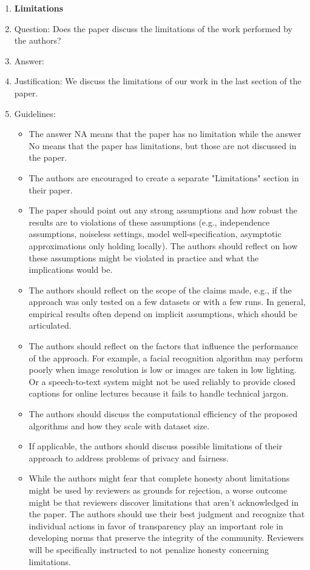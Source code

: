 \documentclass{article}
\begin{document}
\begin{enumerate}
\item {\bf Limitations}
    \item[] Question: Does the paper discuss the limitations of the work performed by the authors?
    \item[] Answer: \answerYes{} %
    \item[] Justification: We discuss the limitations of our work in the last section of the paper.
    \item[] Guidelines:
    \begin{itemize}
        \item The answer NA means that the paper has no limitation while the answer No means that the paper has limitations, but those are not discussed in the paper. 
        \item The authors are encouraged to create a separate "Limitations" section in their paper.
        \item The paper should point out any strong assumptions and how robust the results are to violations of these assumptions (e.g., independence assumptions, noiseless settings, model well-specification, asymptotic approximations only holding locally). The authors should reflect on how these assumptions might be violated in practice and what the implications would be.
        \item The authors should reflect on the scope of the claims made, e.g., if the approach was only tested on a few datasets or with a few runs. In general, empirical results often depend on implicit assumptions, which should be articulated.
        \item The authors should reflect on the factors that influence the performance of the approach. For example, a facial recognition algorithm may perform poorly when image resolution is low or images are taken in low lighting. Or a speech-to-text system might not be used reliably to provide closed captions for online lectures because it fails to handle technical jargon.
        \item The authors should discuss the computational efficiency of the proposed algorithms and how they scale with dataset size.
        \item If applicable, the authors should discuss possible limitations of their approach to address problems of privacy and fairness.
        \item While the authors might fear that complete honesty about limitations might be used by reviewers as grounds for rejection, a worse outcome might be that reviewers discover limitations that aren't acknowledged in the paper. The authors should use their best judgment and recognize that individual actions in favor of transparency play an important role in developing norms that preserve the integrity of the community. Reviewers will be specifically instructed to not penalize honesty concerning limitations.
    \end{itemize}


\end{enumerate}
\end{document}
